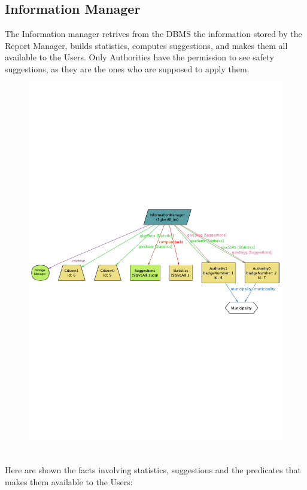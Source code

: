 \documentclass{report}
\begin{document}
\subsection{Information Manager}
The Information manager retrives from the DBMS the information stored by the Report Manager, builds statistics, computes suggestions, and makes them all available to the Users. Only Authorities have the permission to see safety suggestions, as they are the ones who are supposed to apply them.
\begin{figure}[ht!]
	\begin{center}
	\includegraphics[width=.8\textwidth]{./img/GiveAll.pdf}
	\label{fig:allgive}
	\caption{}
	\end{center}
\end{figure}\\
Here are shown the facts involving statistics, suggestions and the predicates that makes them available to the Users:
\end{document}
